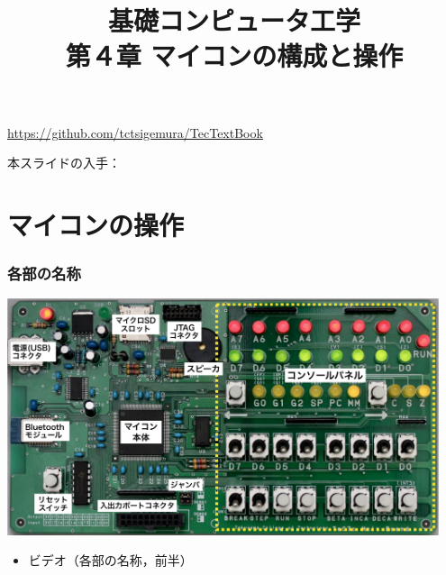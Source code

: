 \documentclass[handout]{beamer}         %
\begin{document}
\title{基礎コンピュータ工学\\第４章 マイコンの構成と操作}
\date{}

\begin{frame}
  \titlepage
  \centerline{\url{https://github.com/tctsigemura/TecTextBook}}
  \vfill
  \centerline{本スライドの入手：
    }
\end{frame}


\section{マイコンの操作}
\begin{frame}
  \frametitle{各部の名称}
  \vfill
  \centerline{
    \includegraphics[width=0.95\textwidth]{../Keynote/kakubu-crop.pdf}}
  \vfill
  \begin{itemize}
    \item ビデオ（各部の名称，前半）
  \end{itemize}
  \vfill
\end{frame}
\end{document}
